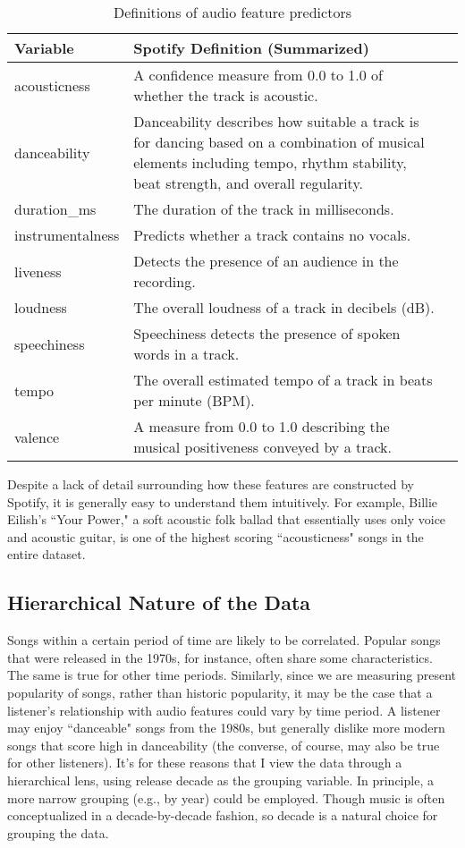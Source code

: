 \documentclass[12pt, twoside]{article}
\begin{document}
\begin{table}[H]
\centering
\caption{Definitions of audio feature predictors}
\label{tab:results}
\def\arraystretch{1.5}
\begin{tabular}{l  p{10cm}  p{3.4cm}} %
\hline
Variable & Spotify Definition (Summarized) \\ \hline
acousticness & A confidence measure from 0.0 to 1.0 of whether the track is acoustic. \\
danceability & Danceability describes how suitable a track is for dancing based on a combination of musical elements including tempo, rhythm stability, beat strength, and overall regularity. \\
duration\_ms & The duration of the track in milliseconds. \\
instrumentalness & Predicts whether a track contains no vocals. \\
liveness & Detects the presence of an audience in the recording. \\
loudness & The overall loudness of a track in decibels (dB). \\
speechiness & Speechiness detects the presence of spoken words in a track. \\
tempo & The overall estimated tempo of a track in beats per minute (BPM). \\
valence & A measure from 0.0 to 1.0 describing the musical positiveness conveyed by a track. 
\end{tabular}
\end{table}
Despite a lack of detail surrounding how these features are constructed by Spotify, it is generally easy to understand them intuitively. For example, Billie Eilish's ``Your Power," a soft acoustic folk ballad that essentially uses only voice and acoustic guitar, is one of the highest scoring ``acousticness" songs in the entire dataset. 

\subsection{Hierarchical Nature of the Data}
Songs within a certain period of time are likely to be correlated. Popular songs that were released in the 1970s, for instance, often share some characteristics. The same is true for other time periods. Similarly, since we are measuring present popularity of songs, rather than historic popularity, it may be the case that a listener's relationship with audio features could vary by time period. A listener may enjoy ``danceable" songs from the 1980s, but generally dislike more modern songs that score high in danceability (the converse, of course, may also be true for other listeners). It's for these reasons that I view the data through a hierarchical lens, using release decade as the grouping variable. In principle, a more narrow grouping (e.g., by year) could be employed. Though music is often conceptualized in a decade-by-decade fashion, so decade is a natural choice for grouping the data.
\end{document}
